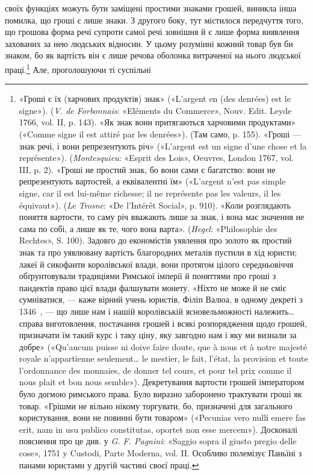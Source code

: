 своїх функціях можуть бути заміщені простими знаками грошей,
виникла інша помилка, що гроші є лише знаки. З другого боку,
тут містилося передчуття того, що грошова форма речі супроти
самої речі зовнішня й є лише форма виявлення захованих за нею
людських відносин. У цьому розумінні кожний товар був би
знаком, бо як вартість він є лише речова оболонка витраченої
на нього людської праці.\footnote{
«Гроші є їх (харчових продуктів) знак» («L’argent en (des denrées)
est le signe»). (\emph{V. de Forbonnais}: «Eléments du Commerce»,
Nouv. Edit. Leyde 1766, vol. II, p. 143). «Як знак вони притягаються
харчовими продуктами» («Comme signe il est attiré par les denrées»). (Там
само, p. 155). «Гроші — знак речі, і вони репрезентують річ» («L’argent
est un signe d’une chose et la représente»). (\emph{Montesquieu}: «Esprit des
Lois», Oeuvres, London 1767, vol. III, p. 2). «Гроші не простий знак,
бо вони сами є багатство: вони не репрезентують вартостей, а еквівалентні
їм» («L’argent n’est pas simple signe, car il est lui-même richesse; il
ne représente pas les valeurs, il les équivaut»). (\emph{Le Trosne}: «De l’Intérêt
Social», p. 910). «Коли розглядають поняття вартости, то саму річ
вважають лише за знак, і вона має значення не сама по собі, а лише як
те, чого вона варта». (\emph{Hegel}: «Philosophie des Rechtes», S. 100). Задовго
до економістів уявлення про золото як простий знак та про уявлювану
вартість благородних металів пустили в хід юристи; лакеї й сикофанти
королівської влади, вони протягом цілого середньовіччя обґрунтовували
традиціями Римської імперії й поняттями про гроші з пандектів
право цієї влади фалшувати монету. «Ніхто не може й не сміє сумніватися,
— каже вірний учень юристів, Філіп Валюа, в одному декреті з 1346~, —
що лише нам і нашій королівській ясновельможності належить\dots{} справа
виготовлення, постачання грошей і всякі розпорядження щодо грошей,
призначати їм такий курс і таку ціну, яку завгодно нам і яку ми визнали
за добре» («Qu’aucum puisse ni doive faire doute, que à nous et à notre
majesté royale n’appartienne seulement\dots{} le mestier, le fait, l’état, la provision
et toute l’ordonnance des monnaies, de donner tel cours, et pour tel
prix comme il nous plait et bon nous semble»). Декретування вартости
грошей імператором було догмою римського права. Було виразно заборонено
трактувати гроші як товар. «Грішми не вільно нікому торгувати,
бо, призначені для загального користування, вони не повинні бути товаром»
(«Pecunias vero nullі emere fas erit, nam in usu publico constitutas,
oportet non esse mercem»). Досконалі пояснення про це див. у \emph{G. F. Pagnini}:
«Saggio sopra il giusto pregio delle cose», 1751 y Custodi, Parte
Moderna, vol. II. Особливо полемізує Паньїні з панами юристами у другій
частині своєї праці.
} Але, проголошуючи ті суспільні
